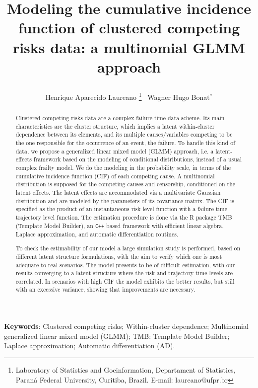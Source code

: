 \documentclass[a4paper,12pt]{article}
\title{
  
  Modeling the cumulative incidence function of clustered competing
  risks data: a multinomial GLMM approach

}
\author{
  Henrique Aparecido Laureano
  \thanks{Laboratory of Statistics and Goeinformation,
    Departament of Statistics,
    Paran\'{a} Federal University, Curitiba, Brazil.
    E-mail: laureano@ufpr.br
  }~
  Wagner Hugo Bonat$^\ast$}
\begin{document}
\maketitle
\medskip

\begin{abstract}

  Clustered competing risks data are a complex failure time data
  scheme. Its main characteristics are the cluster structure, which
  implies a latent within-cluster dependence between its elements, and
  its multiple causes/variables competing to be the one responsible for
  the occurrence of an event, the failure. To handle this kind of data,
  we propose a generalized linear mixed model (GLMM) approach, i.e. a
  latent-effects framework based on the modeling of conditional
  distributions, instead of a usual complex frailty model. We do the
  modeling in the probability scale, in terms of the cumulative
  incidence function (CIF) of each competing cause. A multinomial
  distribution is supposed for the competing causes and censorship,
  conditioned on the latent effects. The latent effects are accommodated
  via a multivariate Gaussian distribution and are modeled by the
  parameters of its covariance matrix. The CIF is specified as the
  product of an instantaneous risk level function with a failure time
  trajectory level function. The estimation procedure is done via the R
  package TMB (Template Model Builder), an \texttt{C++} based framework
  with efficient linear algebra, Laplace approximation, and automatic
  differentiation routines.
  
  To check the estimability of our model a large simulation study is
  performed, based on different latent structure formulations, with the
  aim to verify which one is most adequate to real scenarios. The model
  presents to be of difficult estimation, with our results converging to
  a latent structure where the risk and trajectory time levels are
  correlated. In scenarios with high CIF the model exhibits the better
  results, but still with an excessive variance, showing that
  improvements are necessary.

\end{abstract}

\begin{flushleft}
 \textbf{Keywords}: 
 Clustered competing risks;
 Within-cluster dependence;
 Multinomial generalized linear mixed model (GLMM);
 TMB: Template Model Builder;
 Laplace approximation;
 Automatic differentiation (AD).                    
\end{flushleft}
\end{document}
